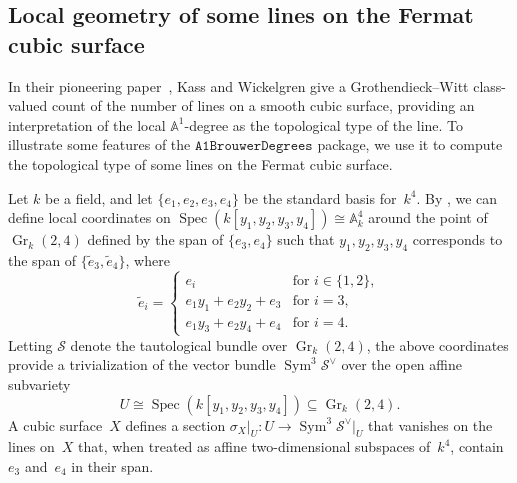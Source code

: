 \documentclass[12pt]{amsart}
\theoremstyle{definition}
\DeclareMathOperator{\Gr}{Gr}
\DeclareMathOperator{\Spec}{Spec}
\DeclareMathOperator{\Sym}{Sym}
\begin{document}
\subsection{Local geometry of some lines on the Fermat cubic surface} 
In their pioneering paper~\cite{CubicKW}, Kass and Wickelgren give a Grothendieck--Witt class-valued count of the number of lines on a smooth cubic surface, providing an interpretation of the local $\mathbb{A}^{1}$-degree as the topological type of the line. To illustrate some features of the $\mathtt{A1BrouwerDegrees}$ package, we use it to compute the topological type of some lines on the Fermat cubic surface.

Let $k$ be a field, and let $\{e_{1},e_{2},e_{3},e_{4}\}$ be the standard basis for~$k^{4}$. By \cite[Lemma~45]{CubicKW}, we can define local coordinates on $\Spec(k[y_{1},y_{2},y_{3},y_{4}])\cong\mathbb{A}_k^{4}$ around the point of $\Gr_k(2,4)$ defined by the span of $\{e_{3},e_{4}\}$ such that $y_{1},y_{2},y_{3},y_{4}$ corresponds to the span of $\{\widetilde{e}_3,\widetilde{e}_{4}\}$, where 
\[
\widetilde{e}_i = \begin{cases}
    e_{i} & \text{for } i\in\{1,2\}, \\
    e_{1}y_{1} + e_{2}y_{2} + e_{3} & \text{for } i=3, \\
    e_{1}y_{3} + e_{2}y_{4} + e_{4} & \text{for } i=4.
\end{cases}
\]
Letting $\mathcal{S}$ denote the tautological bundle over $\Gr_k(2,4)$, the above coordinates provide a trivialization of the vector bundle $\Sym^{3}\mathcal{S}^{\vee}$ over the open affine subvariety
\[
U\cong\Spec(k[y_{1},y_{2},y_{3},y_{4}])\subseteq\Gr_k(2,4).
\]
A cubic surface~$X$ defines a section $\sigma_{X}\rvert_{U}\colon U\to\Sym^{3}\mathcal{S}^{\vee}\rvert_{U}$ that vanishes on the lines on~$X$ that, when treated as affine two-dimensional subspaces of~$k^{4}$, contain $e_{3}$ and~$e_{4}$ in their span. 
\end{document}
